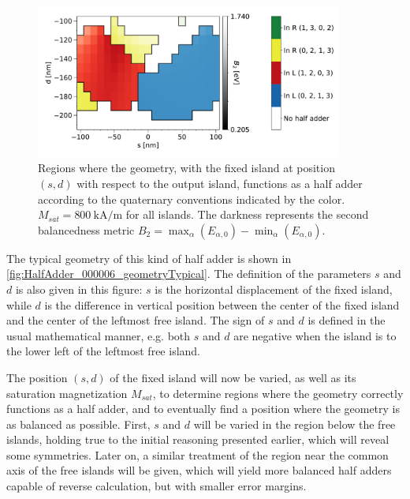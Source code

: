 \documentclass[11pt,a4paper,english]{article}
\begin{document}
\begin{figure}
\centering
\includegraphics[width=0.9\textwidth]{Figures/half_adder/sweep/000006_d-s/table(d100-210_10,s-100-100_10)_balanced2.pdf}
\caption{Regions where the geometry, with the fixed island at position $(s, d)$ with respect to the output island, functions as a half adder according to the quaternary conventions indicated by the color. $M_{sat} = \SI{800}{\kilo\ampere\per\metre}$ for all islands. The darkness represents the second balancedness metric $B_2 = \max_\alpha(E_{\alpha,0}) - \min_\alpha(E_{\alpha,0})$.} 
\label{fig:HalfAdder_000006_sweep_d-s_balanced2}
\end{figure}





The typical geometry of this kind of half adder is shown in \cref{fig:HalfAdder_000006_geometryTypical}. The definition of the parameters $s$ and $d$ is also given in this figure: $s$ is the horizontal displacement of the fixed island, while $d$ is the difference in vertical position between the center of the fixed island and the center of the leftmost free island. The sign of $s$ and $d$ is defined in the usual mathematical manner, e.g. both $s$ and $d$ are negative when the island is to the lower left of the leftmost free island. \par 
The position $(s,d)$ of the fixed island will now be varied, as well as its saturation magnetization $M_{sat}$, to determine regions where the geometry correctly functions as a half adder, and to eventually find a position where the geometry is as balanced as possible. First, $s$ and $d$ will be varied in the region below the free islands, holding true to the initial reasoning presented earlier, which will reveal some symmetries. Later on, a similar treatment of the region near the common axis of the free islands will be given, which will yield more balanced half adders capable of reverse calculation, but with smaller error margins.
\end{document}

